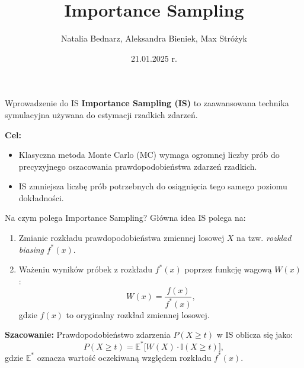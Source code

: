 \documentclass{beamer}
\title{Importance Sampling}
\author{Natalia Bednarz, Aleksandra Bieniek, Max Stróżyk}
\date{21.01.2025 r.}
\begin{document}
\begin{frame}
    \titlepage
\end{frame}

\begin{frame}{Wprowadzenie do IS}
    \textbf{Importance Sampling (IS)} to zaawansowana technika symulacyjna używana do estymacji rzadkich zdarzeń.
    
    \vspace{0.5cm}
    \textbf{Cel:} 
    \begin{itemize}
        \item Klasyczna metoda Monte Carlo (MC) wymaga ogromnej liczby prób do precyzyjnego oszacowania prawdopodobieństwa zdarzeń rzadkich.
        \item IS zmniejsza liczbę prób potrzebnych do osiągnięcia tego samego poziomu dokładności.
    \end{itemize}
\end{frame}

\begin{frame}{Na czym polega Importance Sampling?}
    Główna idea IS polega na:
    \begin{enumerate}
        \item Zmianie rozkładu prawdopodobieństwa zmiennej losowej $X$ na tzw. \textit{rozklad biasing} $f^*(x)$.
        \item Ważeniu wyników próbek z rozkładu $f^*(x)$ poprzez funkcję wagową $W(x)$:
        \[
        W(x) = \frac{f(x)}{f^*(x)},
        \]
        gdzie $f(x)$ to oryginalny rozkład zmiennej losowej.
    \end{enumerate}

    \vspace{0.5cm}
    \textbf{Szacowanie:}
    Prawdopodobieństwo zdarzenia $P(X \geq t)$ w IS oblicza się jako:
    \[
    P(X \geq t) = \mathbb{E}^*\big[W(X) \cdot \mathbb{I}(X \geq t)\big],
    \]
    gdzie $\mathbb{E}^*$ oznacza wartość oczekiwaną względem rozkładu $f^*(x)$.
\end{frame}
\end{document}
